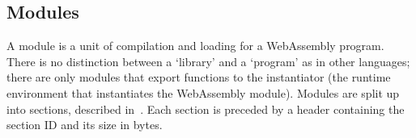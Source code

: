 \documentclass[00-main.tex]{subfiles}
\begin{document}
%
%

\subsection{Modules}

A module is a unit of compilation and loading for a WebAssembly program.
There is no distinction between a `library' and a `program' as in other languages; there are only modules that export functions to the instantiator (the runtime environment that instantiates the WebAssembly module).
Modules are split up into sections, described in~.
Each section is preceded by a header containing the section ID and its size in bytes.
\end{document}

